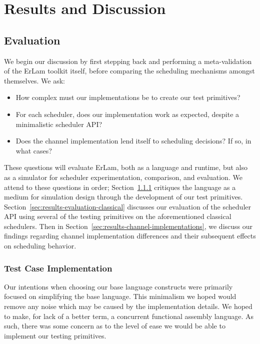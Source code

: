 \chapter{Results and Discussion}
%
\label{chap:results}

\section{Evaluation}\label{sec:results-evaluation}

We begin our discussion by first stepping back and performing a meta-validation 
of the ErLam toolkit itself, before comparing the scheduling mechanisms amongst 
themselves. We ask:
\vspace{-3mm}\begin{itemize}
    \item How complex must our implementations be to create our test primitives? 
    \item For each scheduler, does our implementation work as expected, despite a minimalistic scheduler API?
    \item Does the channel implementation lend itself to scheduling decisions? If so, in what cases?
\end{itemize}\vspace{-3mm}
These questions will evaluate ErLam, both as a language and runtime, but also as a 
simulator for scheduler experimentation, comparison, and evaluation. We attend to
these questions in order;
Section~\ref{sec:results-test-case-implementation} critiques the language as a 
medium for simulation design through the development of our test primitives.
Section~\ref{sec:results-evaluation-classical} discusses our evaluation of the
scheduler API using several of the testing primitives on the aforementioned 
classical schedulers. 
Then in Section~\ref{sec:results-channel-implementations}, we discuss our findings 
regarding channel implementation differences and their subsequent effects on 
scheduling behavior.

\subsection{Test Case Implementation}\label{sec:results-test-case-implementation}

Our intentions when choosing our base language constructs were primarily focused on 
simplifying the base language. This minimalism we hoped would remove any noise 
which may be caused by the implementation details. We hoped to make, for lack of a better
term, a concurrent functional assembly language. As such, there was some concern
as to the level of ease we would be able to implement our testing primitives.

